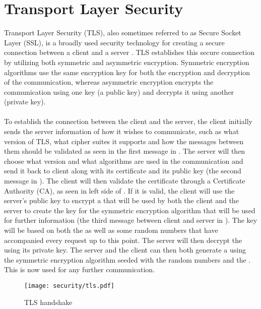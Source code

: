 
\section{Transport Layer Security}
\label{sec:transport_layer_security}

Transport Layer Security (TLS), also sometimes referred to as Secure Socket Layer (SSL), is a broadly used security technology for creating a secure connection between a client and a server \parencite{transport_layer_security}. TLS establishes this secure connection by utilizing both symmetric and asymmetric encryption. Symmetric encryption algorithms use the same encryption key for both the encryption and decryption of the communication, whereas asymmetric encryption encrypts the communication using one key (a public key) and decrypts it using another (private key). 
\\\\
To establish the connection between the client and the server, the client initially sends the server information of how it wishes to communicate, such as what version of TLS, what cipher suites it supports and how the messages between them should be validated as seen in the first message in . The server will then choose what version and what algorithms are used in the communication and send it back to client along with its certificate and its public key (the second message in ). The client will then validate the certificate through a Certificate Authority (CA), as seen in left side of . If it is valid, the client will use the server's public key to encrypt a  that will be used by both the client and the server to create the key for the symmetric encryption algorithm that will be used for further information (the third message between client and server in ). The key will be based on both the  as well as some random numbers that have accompanied every request up to this point. The server will then decrypt the  using its private key. The server and the client can then both generate a  using the symmetric encryption algorithm seeded with the random numbers and the . This  is now used for any further communication.

\begin{figure}[!htbp]
    \centering
    \texttt{[image: security/tls.pdf]}
    \caption{TLS handshake}
    \label{fig:tls}
\end{figure}
\FloatBarrier

